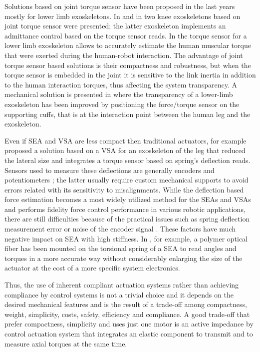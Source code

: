 \documentclass[journal]{IEEEtran}
\begin{document}
%
\par Solutions based on joint torque sensor have been proposed in the last years mostly for lower limb exoskeletons. In \cite{kim2015design} and in \cite{aguirre2011design} two knee exoskeletons based on joint torque sensor were presented; the latter exoskeleton implements an admittance control based on the torque sensor reads. In \cite{hwang2015method} the torque sensor for a lower limb exoskeleton allows to accurately estimate the human muscular torque that were exerted during the human-robot interaction. The advantage of joint torque sensor based solutions is their compactness and robustness, but when the torque sensor is embedded in the joint it is sensitive to the link inertia in addition to the human interaction torques, thus affecting the system transparency. A mechanical solution is presented in \cite{zanotto2013improving} where the transparency of a lower-limb exoskeleton has been improved by positioning the force/torque sensor on the supporting cuffs, that is at the interaction point between the human leg and the exoskeleton.
\par Even if SEA and VSA are less compact then traditional actuators, for example \cite{cestari2014ares} proposed a solution based on a VSA for an exoskeleton of the leg that reduced the lateral size and integrates a torque sensor based on spring's deflection reads. Sensors used to measure these deflections are generally encoders \cite{dos2017design} and potentiometers \cite{junior2016series}; the latter usually require custom mechanical supports to avoid errors related with its sensitivity to misalignments.
While the deflection based force estimation becomes a most widely utilized method for the SEAs and VSAs and performs fidelity force control performance in various robotic applications, there are still difficulties because of the practical issues such as spring deflection measurement error or noise of the encoder signal \cite{lee2018integrated}. These factors have much negative impact on SEA with high stiffness. In \cite{leal2018polymer}, for example, a polymer optical fiber has been mounted on the torsional spring of a SEA to read angles and torques in a more accurate way without considerably enlarging the size of the actuator at the cost of a more specific system electronics.
\par Thus, the use of inherent compliant actuation systems rather than achieving compliance by control systems is not a trivial choice and it depends on the desired mechanical features and is the result of a trade-off among compactness, weight, simplicity, costs, safety, efficiency and compliance.
A good trade-off that prefer compactness, simplicity and uses just one motor is an active impedance by control actuation system that integrates an elastic component to transmit and to measure axial torques at the same time.
\end{document}

